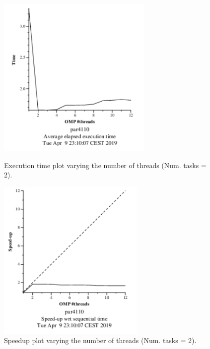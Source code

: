 \documentclass[12pt, a4paper]{article}
\begin{document}
\begin{figure}[H]
\centering
\begin{minipage}[b]{0.4\linewidth}
  \centering
  \includegraphics[scale=1.5]{./mandel-omp-10000-strong-omp-3-2-time}
  \caption{Execution time plot varying the number of threads (Num. tasks = 2).}
  \label{fig:mandel-omp-10000-strong-omp-3-2-time}
\end{minipage}%
\hspace{0.5cm}
\begin{minipage}[b]{0.4\linewidth}
  \centering
  \includegraphics[scale=1.5]{./mandel-omp-10000-strong-omp-3-2-speedup}
  \caption{Speedup plot varying the number of threads (Num. tasks = 2).}
  \label{fig:mandel-omp-10000-strong-omp-3-2-speedup}
\end{minipage}
\end{figure}
\end{document}
